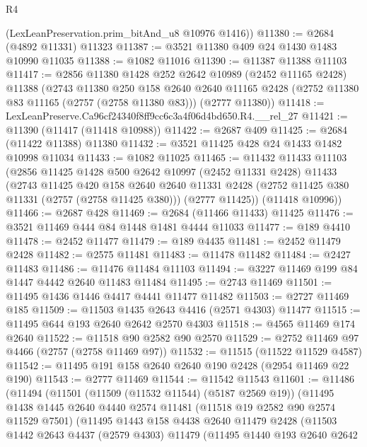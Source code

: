 \begin{lexlean}{R4}
\begin{coremodule}
      (LexLeanPreservation.prim_bitAnd_u8 @10976 @1416))
@11380 := @2684 (@4892 @11331) @11323
@11387 := @3521 @11380 @409 @24 @1430 @1483 @10990 @11035
@11388 := @1082 @11016
@11390 := @11387 @11388 @11103
@11417 := @2856
    @11380
    @1428
    @252
    @2642
    @10989
    (@2452 @11165 @2428)
    @11388
    (@2743
      @11380
      @250
      @158
      @2640
      @2640
      @11165
      @2428
      (@2752 @11380 @83 @11165 (@2757 (@2758 @11380 @83)))
      (@2777 @11380))
@11418 := LexLeanPreserve.Ca96cf24340f8ff9cc6c3a4f06d4bd650.R4.__rel_27
@11421 := @11390 (@11417 (@11418 @10988))
@11422 := @2687 @409
@11425 := @2684 (@11422 @11388) @11380
@11432 := @3521 @11425 @428 @24 @1433 @1482 @10998 @11034
@11433 := @1082 @11025
@11465 := @11432
    @11433
    @11103
    (@2856
      @11425
      @1428
      @500
      @2642
      @10997
      (@2452 @11331 @2428)
      @11433
      (@2743
        @11425
        @420
        @158
        @2640
        @2640
        @11331
        @2428
        (@2752 @11425 @380 @11331 (@2757 (@2758 @11425 @380)))
        (@2777 @11425))
      (@11418 @10996))
@11466 := @2687 @428
@11469 := @2684 (@11466 @11433) @11425
@11476 := @3521 @11469 @444 @84 @1448 @1481 @4444 @11033
@11477 := @189 @4410
@11478 := @2452 @11477
@11479 := @189 @4435
@11481 := @2452 @11479 @2428
@11482 := @2575 @11481
@11483 := @11478 @11482
@11484 := @2427 @11483
@11486 := @11476 @11484 @11103
@11494 := @3227 @11469 @199 @84 @1447 @4442 @2640 @11483 @11484
@11495 := @2743 @11469
@11501 := @11495 @1436 @1446 @4417 @4441 @11477 @11482
@11503 := @2727 @11469 @185
@11509 := @11503 @1435 @2643 @4416 (@2571 @4303) @11477
@11515 := @11495 @644 @193 @2640 @2642 @2570 @4303
@11518 := @4565 @11469 @174 @2640
@11522 := @11518 @90 @2582 @90 @2570
@11529 := @2752 @11469 @97 @4466 (@2757 (@2758 @11469 @97))
@11532 := @11515 (@11522 @11529 @4587)
@11542 := @11495 @191 @158 @2640 @2640 @190 @2428 (@2954 @11469 @22 @190)
@11543 := @2777 @11469
@11544 := @11542 @11543
@11601 := @11486
    (@11494
      (@11501
        (@11509 (@11532 @11544) (@5187 @2569 @19))
        (@11495
          @1438
          @1445
          @2640
          @4440
          @2574
          @11481
          (@11518 @19 @2582 @90 @2574 @11529 @7501)
          (@11495
            @1443
            @158
            @4438
            @2640
            @11479
            @2428
            (@11503
              @1442
              @2643
              @4437
              (@2579 @4303)
              @11479
              (@11495
                @1440
                @193
                @2640
                @2642

\end{coremodule}
\end{lexlean}
